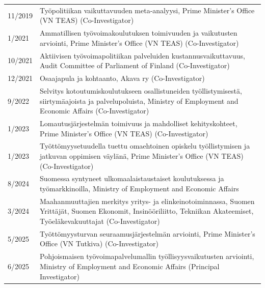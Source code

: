 \documentclass[16pt]{article}
\begin{document}
\begin{tabular}{@{}p{1.5in}p{5in}}
11/2019  & Ty\"{o}politiikan vaikuttavuuden meta-analyysi, 
 Prime Minister's Office (VN TEAS) (Co-Investigator) \\ %
1/2021    & Ammatillisen ty\"{o}voimakoulutuksen toimivuuden ja vaikutusten arviointi, 
Prime Minister's Office (VN TEAS) (Co-Investigator) \\ %
10/2021  & Aktiivisen työvoimapolitiikan palveluiden kustannusvaikuttavuus, %
Audit Committee of Parliament of Finland (Co-Investigator)\\ %
12/2021   & Osaajapula ja kohtaanto, 
Akava ry (Co-Investigator)\\ %
9/2022   & Selvitys kotoutumiskoulutukseen osallistuneiden työllistymisestä, siirtymäajoista ja palvelupoluista,
Ministry of Employment and Economic Affairs (Co-Investigator) \\ %
1/2023  & Lomautusjärjestelmän toimivuus ja mahdolliset kehityskohteet, Prime Minister's Office (VN TEAS) (Co-Investigator) \\ %
1/2023  & Työttömyysetuudella tuettu omaehtoinen opiskelu työllistymisen ja jatkuvan oppimisen väylänä, Prime Minister's Office (VN TEAS) (Co-Investigator) \\ %
8/2024 & Suomessa syntyneet ulkomaalaistaustaiset koulutuksessa ja työmarkkinoilla, Ministry of Employment and Economic Affairs \\
3/2024 & Maahanmuuttajien merkitys yritys- ja elinkeinotoiminnassa, Suomen Yrittäjät, Suomen Ekonomit, Insinööriliitto, Tekniikan Akateemiset, Työeläkevakuuttajat (Co-Investigator)  \\
5/2025 & Työttömyysturvan seuraamusjärjestelmän arviointi, Prime Minister's Office (VN Tutkiva) (Co-Investigator) \\
6/2025 & Pohjoismaisen työvoimapalvelumallin työllisyysvaikutusten arviointi, Ministry of Employment and Economic Affairs  (Principal Investigator) \\ %


\end{tabular}
\end{document}
